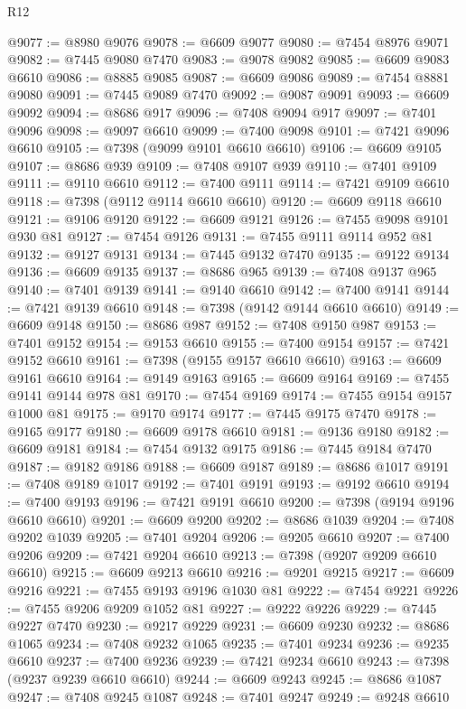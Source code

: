 \begin{lexlean}{R12}
\begin{coremodule}
{{{{{{{{{{{{{{{{{{{{{{{{{{{{{{{{{{{{{{{{{{{{{{{{{{{{{{{{{{{{{{{{{{{{{{{{{{{{{{{{{{@9077 := @8980 @9076
@9078 := @6609 @9077
@9080 := @7454 @8976 @9071
@9082 := @7445 @9080 @7470
@9083 := @9078 @9082
@9085 := @6609 @9083 @6610
@9086 := @8885 @9085
@9087 := @6609 @9086
@9089 := @7454 @8881 @9080
@9091 := @7445 @9089 @7470
@9092 := @9087 @9091
@9093 := @6609 @9092
@9094 := @8686 @917
@9096 := @7408 @9094 @917
@9097 := @7401 @9096
@9098 := @9097 @6610
@9099 := @7400 @9098
@9101 := @7421 @9096 @6610
@9105 := @7398 (@9099 @9101 @6610 @6610)
@9106 := @6609 @9105
@9107 := @8686 @939
@9109 := @7408 @9107 @939
@9110 := @7401 @9109
@9111 := @9110 @6610
@9112 := @7400 @9111
@9114 := @7421 @9109 @6610
@9118 := @7398 (@9112 @9114 @6610 @6610)
@9120 := @6609 @9118 @6610
@9121 := @9106 @9120
@9122 := @6609 @9121
@9126 := @7455 @9098 @9101 @930 @81
@9127 := @7454 @9126
@9131 := @7455 @9111 @9114 @952 @81
@9132 := @9127 @9131
@9134 := @7445 @9132 @7470
@9135 := @9122 @9134
@9136 := @6609 @9135
@9137 := @8686 @965
@9139 := @7408 @9137 @965
@9140 := @7401 @9139
@9141 := @9140 @6610
@9142 := @7400 @9141
@9144 := @7421 @9139 @6610
@9148 := @7398 (@9142 @9144 @6610 @6610)
@9149 := @6609 @9148
@9150 := @8686 @987
@9152 := @7408 @9150 @987
@9153 := @7401 @9152
@9154 := @9153 @6610
@9155 := @7400 @9154
@9157 := @7421 @9152 @6610
@9161 := @7398 (@9155 @9157 @6610 @6610)
@9163 := @6609 @9161 @6610
@9164 := @9149 @9163
@9165 := @6609 @9164
@9169 := @7455 @9141 @9144 @978 @81
@9170 := @7454 @9169
@9174 := @7455 @9154 @9157 @1000 @81
@9175 := @9170 @9174
@9177 := @7445 @9175 @7470
@9178 := @9165 @9177
@9180 := @6609 @9178 @6610
@9181 := @9136 @9180
@9182 := @6609 @9181
@9184 := @7454 @9132 @9175
@9186 := @7445 @9184 @7470
@9187 := @9182 @9186
@9188 := @6609 @9187
@9189 := @8686 @1017
@9191 := @7408 @9189 @1017
@9192 := @7401 @9191
@9193 := @9192 @6610
@9194 := @7400 @9193
@9196 := @7421 @9191 @6610
@9200 := @7398 (@9194 @9196 @6610 @6610)
@9201 := @6609 @9200
@9202 := @8686 @1039
@9204 := @7408 @9202 @1039
@9205 := @7401 @9204
@9206 := @9205 @6610
@9207 := @7400 @9206
@9209 := @7421 @9204 @6610
@9213 := @7398 (@9207 @9209 @6610 @6610)
@9215 := @6609 @9213 @6610
@9216 := @9201 @9215
@9217 := @6609 @9216
@9221 := @7455 @9193 @9196 @1030 @81
@9222 := @7454 @9221
@9226 := @7455 @9206 @9209 @1052 @81
@9227 := @9222 @9226
@9229 := @7445 @9227 @7470
@9230 := @9217 @9229
@9231 := @6609 @9230
@9232 := @8686 @1065
@9234 := @7408 @9232 @1065
@9235 := @7401 @9234
@9236 := @9235 @6610
@9237 := @7400 @9236
@9239 := @7421 @9234 @6610
@9243 := @7398 (@9237 @9239 @6610 @6610)
@9244 := @6609 @9243
@9245 := @8686 @1087
@9247 := @7408 @9245 @1087
@9248 := @7401 @9247
@9249 := @9248 @6610
}}}}}}}}}}}}}}}}}}}}}}}}}}}}}}}}}}}}}}}}}}}}}}}}}}}}}}}}}}}}}}}}}}}}}}}}}}}}}}}}}}
\end{coremodule}
\end{lexlean}
